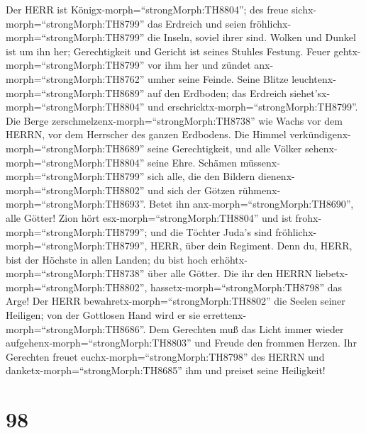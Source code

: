  Der HERR ist Königx-morph=``strongMorph:TH8804''; des freue
sichx-morph=``strongMorph:TH8799'' das Erdreich und seien
fröhlichx-morph=``strongMorph:TH8799'' die Inseln, soviel ihrer sind.
 Wolken und Dunkel ist um ihn her; Gerechtigkeit und Gericht
ist seines Stuhles Festung.  Feuer
gehtx-morph=``strongMorph:TH8799'' vor ihm her und zündet
anx-morph=``strongMorph:TH8762'' umher seine Feinde.  Seine
Blitze leuchtenx-morph=``strongMorph:TH8689'' auf den Erdboden; das
Erdreich siehet'sx-morph=``strongMorph:TH8804'' und
erschricktx-morph=``strongMorph:TH8799''.  Die Berge
zerschmelzenx-morph=``strongMorph:TH8738'' wie Wachs vor dem HERRN, vor
dem Herrscher des ganzen Erdbodens.  Die Himmel
verkündigenx-morph=``strongMorph:TH8689'' seine Gerechtigkeit, und alle
Völker sehenx-morph=``strongMorph:TH8804'' seine Ehre. 
Schämen müssenx-morph=``strongMorph:TH8799'' sich alle, die den Bildern
dienenx-morph=``strongMorph:TH8802'' und sich der Götzen
rühmenx-morph=``strongMorph:TH8693''. Betet ihn
anx-morph=``strongMorph:TH8690'', alle Götter!  Zion hört
esx-morph=``strongMorph:TH8804'' und ist
frohx-morph=``strongMorph:TH8799''; und die Töchter Juda's sind
fröhlichx-morph=``strongMorph:TH8799'', HERR, über dein Regiment.
 Denn du, HERR, bist der Höchste in allen Landen; du bist
hoch erhöhtx-morph=``strongMorph:TH8738'' über alle Götter.
 Die ihr den HERRN liebetx-morph=``strongMorph:TH8802'',
hassetx-morph=``strongMorph:TH8798'' das Arge! Der HERR
bewahretx-morph=``strongMorph:TH8802'' die Seelen seiner Heiligen; von
der Gottlosen Hand wird er sie errettenx-morph=``strongMorph:TH8686''.
 Dem Gerechten muß das Licht immer wieder
aufgehenx-morph=``strongMorph:TH8803'' und Freude den frommen Herzen.
 Ihr Gerechten freuet euchx-morph=``strongMorph:TH8798''
des HERRN und danketx-morph=``strongMorph:TH8685'' ihm und preiset seine
Heiligkeit!

\hypertarget{section-97}{%
\section{98}\label{section-97}}

